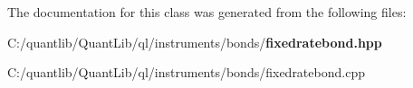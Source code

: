 The documentation for this class was generated from the following files\+:\begin{DoxyCompactItemize}
\item 
C\+:/quantlib/\+Quant\+Lib/ql/instruments/bonds/{\bf fixedratebond.\+hpp}\item 
C\+:/quantlib/\+Quant\+Lib/ql/instruments/bonds/fixedratebond.\+cpp\end{DoxyCompactItemize}
